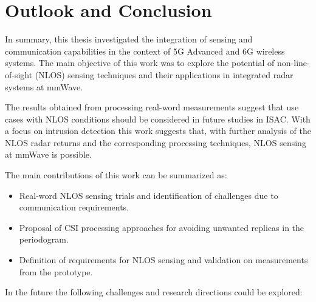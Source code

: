 \chapter{Outlook and Conclusion}

In summary, this thesis investigated the integration of sensing and communication capabilities in the context of 5G Advanced and 6G wireless systems. 
The main objective of this work was to explore the potential of non-line-of-sight (NLOS) sensing techniques and their applications in integrated radar systems at mmWave. 

The results obtained from processing real-word measurements suggest that use cases with NLOS conditions should be considered in future studies in ISAC.
With a focus on intrusion detection this work suggests that, with further analysis of the NLOS radar returns and the corresponding processing techniques, NLOS sensing at mmWave is possible.

The main contributions of this work can be summarized as:

\begin{itemize}
	\item Real-word NLOS sensing trials and identification of challenges due to communication requirements.
	\item Proposal of CSI processing approaches for avoiding unwanted replicas in the periodogram.
	\item Definition of requirements for NLOS sensing and validation on measurements from the prototype.
\end{itemize}

In the future the following challenges and research directions could be explored:

